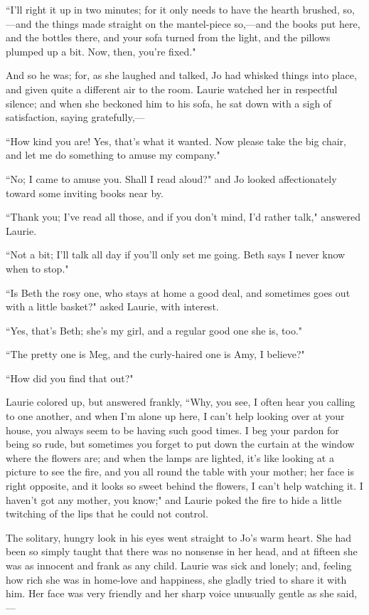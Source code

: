 ``I'll right it up in two minutes; for it only needs to
have the hearth brushed, so,---and the things made straight on the
mantel-piece so,---and the books put here, and the bottles there, and
your sofa turned from the light, and the pillows plumped up a bit. Now,
then, you're fixed."

And so he was; for, as she laughed and talked, Jo had whisked things
into place, and given quite a different air to the room. Laurie watched
her in respectful silence; and when she beckoned him to his sofa, he sat
down with a sigh of satisfaction, saying gratefully,---

``How kind you are! Yes, that's what it wanted. Now
please take the big chair, and let me do something to amuse my company."

``No; I came to amuse you. Shall I read aloud?" and Jo looked
affectionately toward some inviting books near by.

``Thank you; I've read all those, and if you
don't mind, I'd rather talk," answered
Laurie.

``Not a bit; I'll talk all day if you'll
only set me going. Beth says I never know when to stop."

``Is Beth the rosy one, who stays at home a good deal, and sometimes goes
out with a little basket?" asked Laurie, with interest.

``Yes, that's Beth; she's my girl, and a
regular good one she is, too."

``The pretty one is Meg, and the curly-haired one is Amy, I believe?"

``How did you find that out?"

Laurie colored up, but answered frankly, ``Why, you see, I often hear you
calling to one another, and when I'm alone up here, I
can't help looking over at your house, you always seem
to be having such good times. I beg your pardon for being so rude, but
sometimes you forget to put down the curtain at the window where the
flowers are; and when the lamps are lighted, it's like
looking at a picture to see the fire, and you all round the table with
your mother; her face is right opposite, and it looks so sweet behind
the flowers, I can't help watching it. I
haven't got any mother, you know;" and Laurie poked the
fire to hide a little twitching of the lips that he could not control.

The solitary, hungry look in his eyes went straight to
Jo's warm heart. She had been so simply taught that
there was no nonsense in her head, and at fifteen she was as innocent
and frank as any child. Laurie was sick and lonely; and, feeling how
rich she was in home-love and happiness, she gladly tried to share it
with him. Her face was very friendly and her sharp voice unusually
gentle as she said,---

